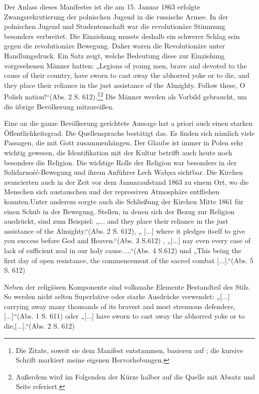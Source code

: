 \documentclass[12pt,headsepline,a4paper]{scrartcl}
\begin{document}
Der Anlass dieses Manifestes ist die am 15. Januar 1863 erfolgte Zwangsrekrutierung der
polnischen Jugend in die russische Armee. In der polnischen Jugend und Studentenschaft war die
revolutionäre Stimmung besonders verbreitet. Die Einziehung musste deshalb ein schwerer Schlag
sein gegen die revolutionäre Bewegung. Daher waren die Revolutionäre unter Handlungsdruck. Ein
Satz zeigt, welche Bedeutung diese zur Einziehung vorgesehenen Männer hatten: „Legions of young
men, brave and devoted to the cause of their country, have sworn to cast away the abhorred yoke or
to die, and they place their reliance in the just assistance of the Almighty. Follow these, O Polish
nation!“(Abs. 2 S. 612).\footnote{
Die Zitate, soweit sie dem Manifest entstammen, basieren auf ; 
die kursive Schrift
markiert meine eigenen Hervorhebungen.}\footnote{Außerdem wird im Folgenden der Kürze halber auf die Quelle mit Absatz und Seite referiert.}
Die Männer werden als Vorbild gebraucht, um die übrige Bevölkerung
mitzureißen.

Eine an die ganze Bevölkerung gerichtete Aussage hat a priori auch einen starken
Öffentlichkeitsgrad. Die Quellensprache bestätigt das. Es finden sich nämlich viele Passagen, die
mit Gott zusammenhängen. Der Glaube ist immer in Polen sehr wichtig gewesen, die Identifikation
mit der Kultur betrifft auch heute noch besonders die Religion. Die wichtige Rolle der Religion war
besonders in der Solidarność-Bewegung und ihrem Anführer Lech Wałęsa sichtbar. Die Kirchen
avancierten auch in der Zeit vor dem Januaraufstand 1863 zu einem Ort, wo die Menschen sich
austauschen und der repressiven Atmosphäre entfliehen konnten.Unter anderem sorgte auch die
Schließung der Kirchen Mitte 1861 für einen Schub in der Bewegung. Stellen, in denen sich der
Bezug zur Religion ausdrückt, sind zum Beispiel: „... and they place their reliance in the just
assistance of the Almighty.“(Abs. 2 S. 612), „ [...] where it pledges itself to give you success before
God and Heaven.“(Abs. 3 S.612) , „[...] nay even every case of lack of sufficient zeal in our holy
cause.....“(Abs. 4 S.612) und „This being the first day of open resistance, the commencement of the
sacred combat [...].“(Abs. 5 S. 612)

Neben der religiösen Komponente sind volksnahe Elemente Bestandteil des Stils. So werden nicht
selten Superlative oder starke Ausdrücke verwendet: „[...] carrying away many thousands of its
bravest and most strenuous defenders,[...]“(Abs. 1 S. 611) oder „[...] have sworn to cast away the
abhorred yoke or to die,[...].“(Abs. 2 S. 612)
\end{document}

